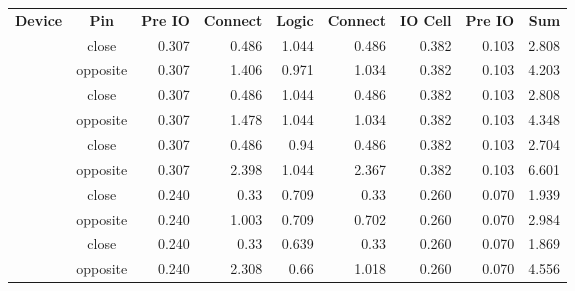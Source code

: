 \documentclass[11pt]{article}
\begin{document}
 
 
\renewcommand{\arraystretch}{1.5}
 \newcommand{\ct}{\color{white}\bf}
\begin{tabular}{cc*{7}{r}}
\rowcolor{Blue!50}
\ct Device & \ct Pin & \ct Pre IO & \ct Connect & \ct Logic & \ct Connect & \ct IO Cell & \ct Pre IO & \ct Sum \\
\rowcolor{white}
  & close & 0.307 & 0.486 & 1.044 & 0.486 & 0.382 & 0.103 & 2.808\\
\rowcolor{white}
 \multirow{-2}{*}{lp384} & opposite & 0.307 & 1.406 & 0.971 & 1.034 & 0.382 & 0.103 & 4.203\\
\rowcolor{blue!10}
  & close & 0.307 & 0.486 & 1.044 & 0.486 & 0.382 & 0.103 & 2.808\\
\rowcolor{blue!10}
 \multirow{-2}{*}{lp1k} & opposite & 0.307 & 1.478 & 1.044 & 1.034 & 0.382 & 0.103 & 4.348\\
\rowcolor{white}
  & close & 0.307 & 0.486 & 0.94 & 0.486 & 0.382 & 0.103 & 2.704\\
\rowcolor{white}
 \multirow{-2}{*}{lp8k} & opposite & 0.307 & 2.398 & 1.044 & 2.367 & 0.382 & 0.103 & 6.601\\
\rowcolor{blue!10}
  & close & 0.240 & 0.33 & 0.709 & 0.33 & 0.260 & 0.070 & 1.939\\
\rowcolor{blue!10}
 \multirow{-2}{*}{hx1k} & opposite & 0.240 & 1.003 & 0.709 & 0.702 & 0.260 & 0.070 & 2.984\\
\rowcolor{white}
  & close & 0.240 & 0.33 & 0.639 & 0.33 & 0.260 & 0.070 & 1.869\\
\rowcolor{white}
 \multirow{-2}{*}{hx8k} & opposite & 0.240 & 2.308 & 0.66 & 1.018 & 0.260 & 0.070 & 4.556\\
\end{tabular}
\end{document}
